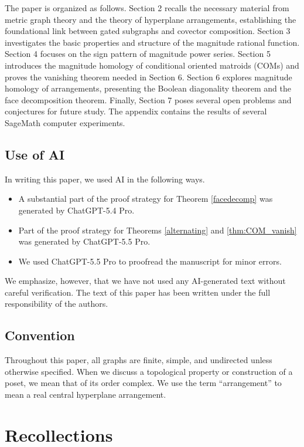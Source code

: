 \documentclass{amsart}
\numberwithin{equation}{section}
\theoremstyle{plain}
\theoremstyle{remark}
\theoremstyle{definition}
\numberwithin{equation}{section}
\begin{document}
The paper is organized as follows.
Section 2 recalls the necessary material from metric graph theory and the theory of hyperplane arrangements, establishing the foundational link between gated subgraphs and covector composition.
Section 3 investigates the basic properties and structure of the magnitude rational function.
Section 4 focuses on the sign pattern of magnitude power series.
Section 5 introduces the magnitude homology of conditional oriented matroids (COMs) and proves the vanishing theorem needed in Section 6.
Section 6 explores magnitude homology of arrangements, presenting the Boolean diagonality theorem and the face decomposition theorem.
Finally, Section 7 poses several open problems and conjectures for future study. The appendix contains the results of several SageMath computer experiments.

\subsection*{Use of AI}
In writing this paper, we used AI in the following ways.
\begin{itemize}
    \item A substantial part of the proof strategy for Theorem \ref{facedecomp} was generated by ChatGPT-5.4 Pro.
    \item Part of the proof strategy for Theorems \ref{alternating} and \ref{thm:COM_vanish} was generated by ChatGPT-5.5 Pro.
    \item We used ChatGPT-5.5 Pro to proofread the manuscript for minor errors.
\end{itemize}
We emphasize, however, that we have not used any AI-generated text without careful verification. The text of this paper has been written under the full responsibility of the authors.


\subsection*{Convention}
Throughout this paper, all graphs are finite, simple, and undirected unless otherwise specified. 
When we discuss a topological property or construction of a poset, we mean that of its order complex.
We use the term ``arrangement'' to mean a real central hyperplane arrangement.



\section{Recollections}
\end{document}
